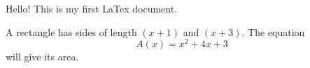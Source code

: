 \documentclass[10pt]{article}
\begin{document}
Hello! This is my first LaTex document.

A rectangle has sides of length $(x+1)$ and $(x+3)$.
The equation $${A(x) = x^2 + 4x + 3}$$  will give its area.
\end{document}
